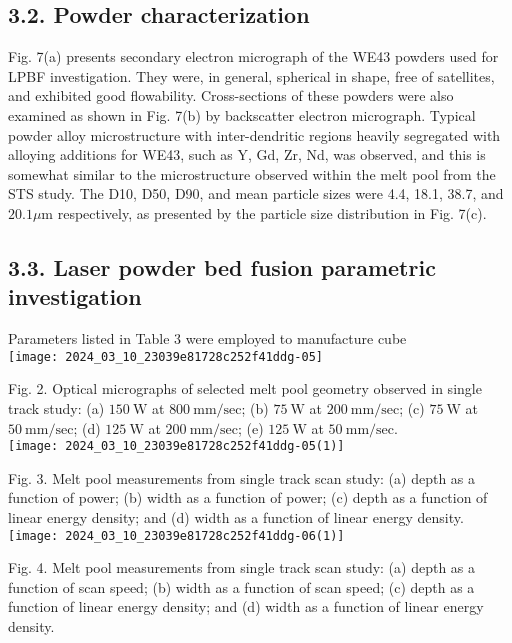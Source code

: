 \documentclass[10pt]{article}
\begin{document}
\subsection*{3.2. Powder characterization}
Fig. 7(a) presents secondary electron micrograph of the WE43 powders used for LPBF investigation. They were, in general, spherical in shape, free of satellites, and exhibited good flowability. Cross-sections of these powders were also examined as shown in Fig. 7(b) by backscatter electron micrograph. Typical powder alloy microstructure with inter-dendritic regions heavily segregated with alloying additions for WE43, such as Y, Gd, Zr, Nd, was observed, and this is somewhat similar to the microstructure observed within the melt pool from the STS study. The D10, D50, D90, and mean particle sizes were 4.4, 18.1, 38.7, and $20.1 \mu \mathrm{m}$ respectively, as presented by the particle size distribution in Fig. 7(c).

\subsection*{3.3. Laser powder bed fusion parametric investigation}
Parameters listed in Table 3 were employed to manufacture cube\\
\texttt{[image: 2024\_03\_10\_23039e81728c252f41ddg-05]}

Fig. 2. Optical micrographs of selected melt pool geometry observed in single track study: (a) $150 \mathrm{~W}$ at $800 \mathrm{~mm} / \mathrm{sec}$; (b) $75 \mathrm{~W}$ at $200 \mathrm{~mm} / \mathrm{sec}$; (c) $75 \mathrm{~W}$ at $50 \mathrm{~mm} / \mathrm{sec}$; (d) $125 \mathrm{~W}$ at $200 \mathrm{~mm} / \mathrm{sec}$; (e) $125 \mathrm{~W}$ at $50 \mathrm{~mm} / \mathrm{sec}$.\\
\texttt{[image: 2024\_03\_10\_23039e81728c252f41ddg-05(1)]}

Fig. 3. Melt pool measurements from single track scan study: (a) depth as a function of power; (b) width as a function of power; (c) depth as a function of linear energy density; and (d) width as a function of linear energy density.\\
\texttt{[image: 2024\_03\_10\_23039e81728c252f41ddg-06(1)]}

Fig. 4. Melt pool measurements from single track scan study: (a) depth as a function of scan speed; (b) width as a function of scan speed; (c) depth as a function of linear energy density; and (d) width as a function of linear energy density.
\end{document}
